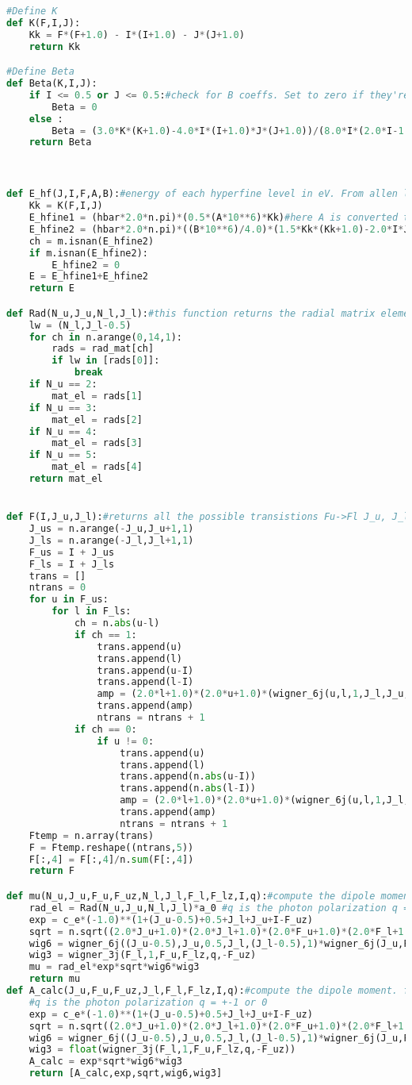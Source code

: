 {\begin{lstlisting}[language=Python,breaklines]
#Define K
def K(F,I,J):
	Kk = F*(F+1.0) - I*(I+1.0) - J*(J+1.0)
	return Kk

#Define Beta
def Beta(K,I,J):
	if I <= 0.5 or J <= 0.5:#check for B coeffs. Set to zero if they're not important
		Beta = 0
	else :
		Beta = (3.0*K*(K+1.0)-4.0*I*(I+1.0)*J*(J+1.0))/(8.0*I*(2.0*I-1.0)*J*(2.0*J-1.0))
	return Beta



def E_hf(J,I,F,A,B):#energy of each hyperfine level in eV. From allen leary's thesis
	Kk = K(F,I,J)
	E_hfine1 = (hbar*2.0*n.pi)*(0.5*(A*10**6)*Kk)#here A is converted to Hz, same for B on the next line
	E_hfine2 = (hbar*2.0*n.pi)*((B*10**6)/4.0)*(1.5*Kk*(Kk+1.0)-2.0*I*J*(I+1.0)*(J+1.0))/(I*J*(2.0*I-1.0)*(2.0*J-1.0))
	ch = m.isnan(E_hfine2)
	if m.isnan(E_hfine2):
		E_hfine2 = 0
	E = E_hfine1+E_hfine2
	return E

def Rad(N_u,J_u,N_l,J_l):#this function returns the radial matrix element for two states in units of a_0
	lw = (N_l,J_l-0.5)
	for ch in n.arange(0,14,1):
		rads = rad_mat[ch]
		if lw in [rads[0]]:
			break
	if N_u == 2:
		mat_el = rads[1]
	if N_u == 3:
		mat_el = rads[2]
	if N_u == 4:
		mat_el = rads[3]
	if N_u == 5:
		mat_el = rads[4]
	return mat_el


def F(I,J_u,J_l):#returns all the possible transistions Fu->Fl J_u, J_l
	J_us = n.arange(-J_u,J_u+1,1)
	J_ls = n.arange(-J_l,J_l+1,1)
	F_us = I + J_us
	F_ls = I + J_ls
	trans = []
	ntrans = 0
	for u in F_us:
		for l in F_ls:
			ch = n.abs(u-l)
			if ch == 1:
				trans.append(u)
				trans.append(l)
				trans.append(u-I)
				trans.append(l-I)
				amp = (2.0*l+1.0)*(2.0*u+1.0)*(wigner_6j(u,l,1,J_l,J_u,I))**2
				trans.append(amp)
				ntrans = ntrans + 1
			if ch == 0:
				if u != 0:
					trans.append(u)
					trans.append(l)
					trans.append(n.abs(u-I))
					trans.append(n.abs(l-I))
					amp = (2.0*l+1.0)*(2.0*u+1.0)*(wigner_6j(u,l,1,J_l,J_u,I))**2
					trans.append(amp)
					ntrans = ntrans + 1
	Ftemp = n.array(trans)
	F = Ftemp.reshape((ntrans,5))
	F[:,4] = F[:,4]/n.sum(F[:,4])
	return F

def mu(N_u,J_u,F_u,F_uz,N_l,J_l,F_l,F_lz,I,q):#compute the dipole moment. from eq. 4.33 pg 55 in Laser cooling and Trapping (Metcalf)
	rad_el = Rad(N_u,J_u,N_l,J_l)*a_0 #q is the photon polarization q = +-1 or 0
	exp = c_e*(-1.0)**(1+(J_u-0.5)+0.5+J_l+J_u+I-F_uz)
	sqrt = n.sqrt((2.0*J_u+1.0)*(2.0*J_l+1.0)*(2.0*F_u+1.0)*(2.0*F_l+1.0))
	wig6 = wigner_6j((J_u-0.5),J_u,0.5,J_l,(J_l-0.5),1)*wigner_6j(J_u,F_u,I,F_l,J_l,1)
	wig3 = wigner_3j(F_l,1,F_u,F_lz,q,-F_uz)
	mu = rad_el*exp*sqrt*wig6*wig3
	return mu
def A_calc(J_u,F_u,F_uz,J_l,F_l,F_lz,I,q):#compute the dipole moment. from eq. 4.33 pg 55 in Laser cooling and Trapping (Metcalf)
	#q is the photon polarization q = +-1 or 0
	exp = c_e*(-1.0)**(1+(J_u-0.5)+0.5+J_l+J_u+I-F_uz)
	sqrt = n.sqrt((2.0*J_u+1.0)*(2.0*J_l+1.0)*(2.0*F_u+1.0)*(2.0*F_l+1.0))
	wig6 = wigner_6j((J_u-0.5),J_u,0.5,J_l,(J_l-0.5),1)*wigner_6j(J_u,F_u,I,F_l,J_l,1)
	wig3 = float(wigner_3j(F_l,1,F_u,F_lz,q,-F_uz))
	A_calc = exp*sqrt*wig6*wig3
	return [A_calc,exp,sqrt,wig6,wig3]
	

\end{lstlisting}}
